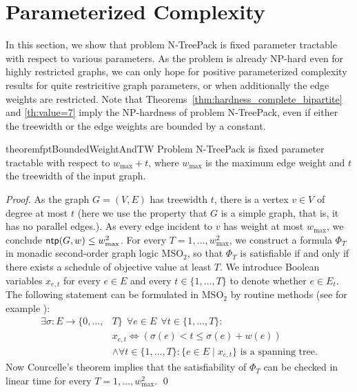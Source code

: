 \documentclass[runningheads]{llncs}
\newcommand{\set}[1]{\{ #1 \}}
\newcommand{\bigO}{\mathcal{O}}
\newcommand{\xxxNTP}{{\sc N-TreePack}}
\DeclareMathOperator{\ntp}{\text{\sf ntp}}
\newcommand{\lasse}[1]{#1}
\begin{document}
\section{Parameterized Complexity}
\label{sec:parameterized}
In this section, we show that problem {\xxxNTP} is fixed parameter tractable with 
respect to various parameters. \lasse{As the problem is already NP-hard even for highly restricted graphs,
we can only hope for positive parameterized complexity results for quite restricitive graph parameters,
or when additionally the edge weights are restricted.}
Note that Theorems~\ref{thm:hardness_complete_bipartite} and \ref{th:value=7} imply the NP-hardness 
of problem {\xxxNTP}, even if either the treewidth or the edge weights are bounded by a constant. 

\begin{restatable}{theorem}{fptBoundedWeightAndTW}
\label{th:fpt_weights_and_tw_bounded}
\lasse{Problem {\xxxNTP} is fixed parameter tractable with respect to $w_{\max} + t$, where $w_{\max}$ is the maximum edge weight and $t$ the treewidth of the input graph.}
\end{restatable}
\begin{proof}
As the graph $G=(V,E)$ has treewidth $t$, there is a vertex $v\in V$ of degree at most $t$ \lasse{(here we use the property that $G$ is a simple graph, that is, it has no parallel edges.)}.
As every edge incident to $v$ has weight at most $w_{\max}$, we conclude $\ntp(G,w)\le w_{\max}^2$. 
For every $T=1,\ldots,w_{\max}^2$, we construct a formula $\Phi_T$ in monadic second-order 
graph logic $\text{MSO}_2$, so that $\Phi_T$ is satisfiable if and only if there exists a schedule 
of objective value at least $T$. 
We introduce Boolean variables $x_{e,t}$ for every $e\in E$ and every $t\in \{1,\dots,T\}$
to denote whether $e\in E_t$. 
The following statement can be formulated in $\text{MSO}_2$ by routine methods \lasse{(see for example \cite[chapter 7.4]{cygan2015parameterized})}:
\begin{align*}
\exists \sigma: E\to\{0,\ldots,&T\} ~~\forall e\in E ~~\forall t\in\{1,\ldots,T\}: \\
& x_{e,t} \iff \left(\sigma(e) < t \leq \sigma(e) + w(e)\right)\\
& \land \forall t\in\{1,\ldots,T\}: \set{e\in E \mid x_{e,t}} \text{ is a spanning tree.}
\end{align*}
Now Courcelle's theorem \cite{courcelle1990monadic} implies that the satisfiability of $\Phi_T$ 
can be checked in linear time for every $T=1,\ldots,w_{\max}^2$.
\qed
\end{proof}
\end{document}
